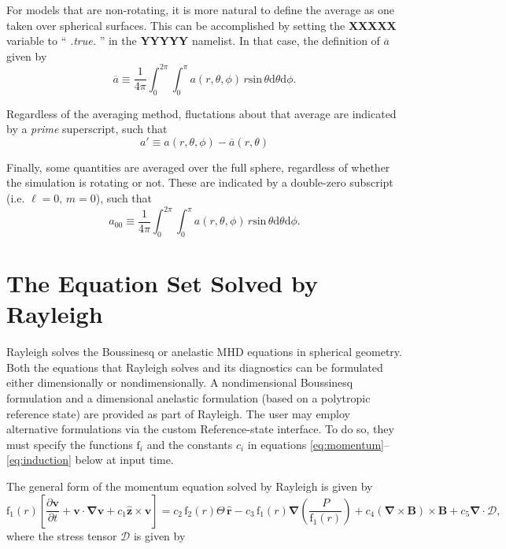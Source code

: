 \documentclass[10pt, letterpaper]{article}
\newcommand{\ff}{\mathrm{f}}
\begin{document}
For models that are non-rotating, it is more natural to define the average as one taken over spherical surfaces.  This can be accomplished by setting the \textbf{XXXXX} variable to `` \textit{.true.} '' in the \textbf{YYYYY} namelist.  In that case, the definition of $\overline{a}$ given by
\begin{equation}
\label{eq:fullsph}
\overline{a}\equiv \frac{1}{4\pi}\int_{0}^{2\pi}\int_{0}^{\pi} a(r,\theta,\phi)\, r\mathrm{sin}\,\theta\mathrm{d}\theta\mathrm{d}\phi.
\end{equation}

Regardless of the averaging method, fluctations about that average are indicated by a \textit{prime} superscript, such that
\begin{equation}
\label{eq:prime}
a'\equiv a(r,\theta,\phi)-\overline{a}(r,\theta)
\end{equation}

Finally, some quantities are averaged over the full sphere, regardless of whether the simulation is rotating or not.  These are indicated by a double-zero subscript (i.e. $\ell=0,\,m=0$), such that
\begin{equation}
\label{eq:fullsph}
a_{00}\equiv \frac{1}{4\pi}\int_{0}^{2\pi}\int_{0}^{\pi} a(r,\theta,\phi)\, r\mathrm{sin}\,\theta\mathrm{d}\theta\mathrm{d}\phi.
\end{equation}


\section{The Equation Set Solved by Rayleigh}
Rayleigh solves the Boussinesq or anelastic MHD equations in spherical geometry.  Both the equations that Rayleigh solves and its diagnostics can be formulated either dimensionally or nondimensionally.  A nondimensional Boussinesq formulation and a dimensional anelastic formulation (based on a polytropic reference state) are provided as part of Rayleigh.  The user may employ alternative formulations via the custom Reference-state interface.  To do so, they must specify the functions $\ff_i$ and the constants $c_i$ in equations \ref{eq:momentum}--\ref{eq:induction} below at input time.   

The general form of the momentum equation solved by Rayleigh is given by
\begin{equation}
\label{eq:momentum}
\ff_1(r)\left[\frac{\partial \boldsymbol{v}}{\partial t} +\boldsymbol{v}\cdot\boldsymbol{\nabla}\boldsymbol{v}  %
                                                         +c_1\boldsymbol{\hat{z}}\times\boldsymbol{v} \right]  = %
                                                         c_2\,\ff_2(r)\Theta\,\boldsymbol{\hat{r}} %
                                                         -c_3\,\ff_1(r)\boldsymbol{\nabla}\left(\frac{P}{\ff_1(r)}\right) %
                                                         +c_4\left(\boldsymbol{\nabla}\times\boldsymbol{B}\right)\times\boldsymbol{B} %
                                                         +c_5\boldsymbol{\nabla}\cdot\boldsymbol{\mathcal{D}},
\end{equation}
where the stress tensor $\mathcal{D}$ is given by
\end{document}
